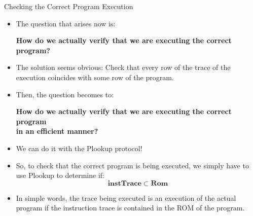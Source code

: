 \begin{frame}[allowframebreaks]{Checking the Correct Program Execution}
\begin{itemize}
\item The question that arises now is:
\begin{center}
\textbf{How do we actually verify that we are executing the correct program?}
\end{center}

\item The solution seems obvious: Check that every row of the trace of the execution coincides with some row of the program.

\item Then, the question becomes to:
\begin{center}
\textbf{How do we actually verify that we are executing the correct program \\ in an efficient manner?}
\end{center}

\framebreak

\item We can do it with the Plookup protocol!

\item So, to check that the correct program is being executed, we simply have to use Plookup to determine if:
\[
\mathbf{instTrace} \subset \mathbf{Rom}
\]

\item In simple words, the trace being executed is an execution of the actual program if the instruction trace is contained in the ROM of the program.
\end{itemize}
\end{frame}











